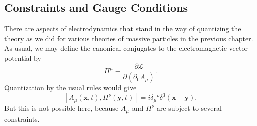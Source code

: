 
\subsection{Constraints and Gauge Conditions}

There are aspects of electrodynamics that stand in the way of quantizing
the theory as we did for various theories of massive particles in the
previous chapter. As usual, we may define the canonical conjugates to the
electromagnetic vector potential by
\begin{equation}
  \Pi^\mu\equiv\frac{\partial\mathcal L}{\partial(\partial_0A_\mu)}.
  \tag{8.2.1}\label{eq:8.2.1}
\end{equation}
Quantization by the usual rules would give
\[
  [A_\mu(\mathbf x,t),\Pi^\nu(\mathbf y,t)]
  =i\delta_\mu{}^\nu\delta^3(\mathbf x-\mathbf y).
\]
But this is not possible here, because $A_\mu$ and $\Pi^\nu$ are subject to
several constraints.

